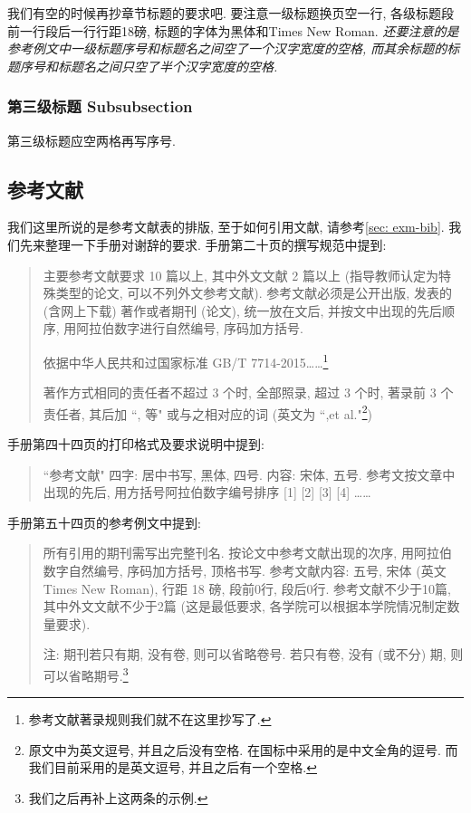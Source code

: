 我们有空的时候再抄章节标题的要求吧. 要注意一级标题换页空一行, 各级标题段前一行段后一行行距18磅, 标题的字体为黑体和Times New Roman. \emph{还要注意的是参考例文中一级标题序号和标题名之间空了一个汉字宽度的空格, 而其余标题的标题序号和标题名之间只空了半个汉字宽度的空格.}

\subsubsection{第三级标题 Subsubsection}

第三级标题应空两格再写序号.

\zhlipsum[1]

\subsection{参考文献}

我们这里所说的是参考文献表的排版, 至于如何引用文献, 请参考\ref{sec: exm-bib}. 我们先来整理一下手册对谢辞的要求. 手册第二十页的撰写规范中提到:
\begin{quote}
  主要参考文献要求 10 篇以上, 其中外文文献 2 篇以上 (指导教师认定为特殊类型的论文, 可以不列外文参考文献).  参考文献必须是公开出版, 发表的 (含网上下载) 著作或者期刊 (论文), 统一放在文后, 并按文中出现的先后顺序, 用阿拉伯数字进行自然编号, 序码加方括号.

  依据中华人民共和过国家标准 GB/T 7714-2015\ldots\ldots\footnote{参考文献著录规则我们就不在这里抄写了.}

  著作方式相同的责任者不超过 3 个时, 全部照录, 超过 3 个时, 著录前 3 个责任者, 其后加 ``, 等" 或与之相对应的词 (英文为 ``,et al."\footnote{原文中为英文逗号, 并且之后没有空格. 在国标中采用的是中文全角的逗号. 而我们目前采用的是英文逗号, 并且之后有一个空格.})
\end{quote}
手册第四十四页的打印格式及要求说明中提到:
\begin{quote}
  ``参考文献" 四字: 居中书写, 黑体, 四号.
  内容: 宋体, 五号.
  参考文按文章中出现的先后, 用方括号阿拉伯数字编号排序 [1] [2] [3] [4] \dots\dots
\end{quote}
手册第五十四页的参考例文中提到:
\begin{quote}
  所有引用的期刊需写出完整刊名. 按论文中参考文献出现的次序, 用阿拉伯数字自然编号, 序码加方括号, 顶格书写.
  参考文献内容: 五号, 宋体 (英文 Times New Roman), 行距 18 磅, 段前0行, 段后0行.
  参考文献不少于10篇, 其中外文文献不少于2篇 (这是最低要求, 各学院可以根据本学院情况制定数量要求).

  注: 期刊若只有期, 没有卷, 则可以省略卷号. 若只有卷, 没有 (或不分) 期, 则可以省略期号.\footnote{我们之后再补上这两条的示例.}
\end{quote}


